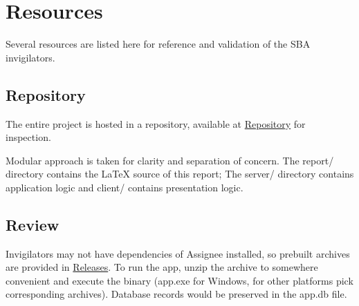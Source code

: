 \section{Resources}
\label{overview.src}

Several resources are listed here for reference and validation of the SBA
invigilators.

\subsection{Repository}
\label{overview.src.repo}

The entire project is hosted in a repository, available at
\href{https://github.com/CarbonicSoda/assignee}{Repository} for inspection.

Modular approach is taken for clarity and separation of concern. The report/
directory contains the \LaTeX{} source of this report; The server/ directory contains
application logic and client/ contains presentation logic.

\subsection{Review}
\label{overview.src.review}

Invigilators may not have dependencies of Assignee installed, so prebuilt
archives are provided in
\href{https://github.com/CarbonicSoda/assignee/releases}{Releases}. To run the app,
unzip the archive to somewhere convenient and execute the binary (app.exe for Windows,
for other platforms pick corresponding archives). Database records would be
preserved in the app.db file.